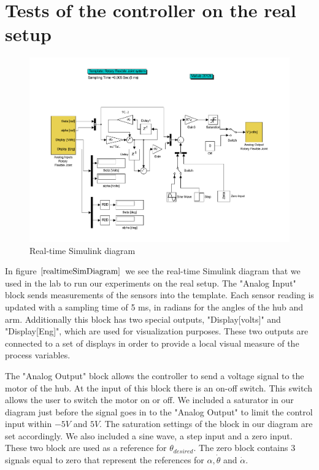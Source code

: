 \documentclass[ twoside,openright,titlepage,numbers=noenddot,headinclude,%
                footinclude=true,cleardoublepage=empty,abstractoff, %
                BCOR=5mm,paper=a4,fontsize=11pt,%
                ngerman,american,%
                ]{scrreprt}
\begin{document}
{{\chapter{Tests of the controller on the real setup}

\begin{figure} \label{realtimeSimDiagram}
  \centering
  \includegraphics[scale=0.4]{images/realtimeSimDiagram}
  \caption{Real-time Simulink diagram} 
\end{figure}

In figure $\eqref{realtimeSimDiagram}$ we see the real-time Simulink diagram that we used in the lab to run our experiments on the real setup. The "Analog Input" block sends measurements of the sensors into the template. Each sensor reading is updated with a sampling time of 5 ms, in radians for the angles of the hub and arm. Additionally this block has two special outputs, "Display[volts]" and "Display[Eng]", which are used for visualization purposes. These two outputs are connected to a set of displays in order to provide a local visual measure of the process variables. 

The "Analog Output" block allows the controller to send a voltage signal to the motor of the hub. At the input of this block there is an on-off switch. This switch allows the user to switch the motor on or off. We included a saturator in our diagram just before the signal goes in to the "Analog Output" to limit the control input within $-5V$ and $5V$. The saturation settings of the block in our diagram are set accordingly. We also included a sine wave, a step input and a zero input. These two block are used as a reference for $\theta_{desired}$. The zero block contains 3 signals equal to zero that represent the references for $\alpha, \dot{\theta}$ and $\dot{\alpha}$.


}}
\end{document}
